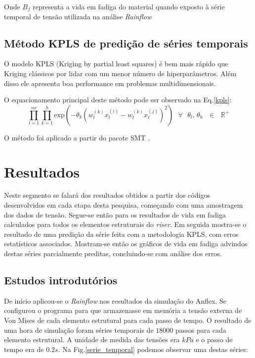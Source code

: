Onde $B_f$ representa a vida em fadiga do material quando exposto à série  temporal de tensão utilizada na análise \emph{Rainflow}

\subsection{Método KPLS de predição de séries temporais}

O modelo KPLS (Kriging by partial least squares) é bem mais rápido que Kriging clássicos por lidar com um menor número de hiperparâmetros. Além disso ele apresenta boa performance em problemas multidimensionais.

O equacionamento principal deste método pode ser observado na Eq.\ref{kpls}:
\begin{equation}\label{kpls}
    \prod^{nx}_{l=1} \prod^{h}_{k=1} \text{exp} \left( -\theta_k \left(w_l^{(k)} x_l^{(i)} - w_l^{(k)} x_l^{(j)} \right)^2\right) \text{      $\forall$ $\theta_l$, $\theta_h$ $\in$ $\mathds{R^+}$}
\end{equation}

O método foi aplicado a partir do pacote SMT \cite{BOUHLEL2019}.

\section{Resultados}

Neste segmento se falará dos resultados obtidos a partir dos códigos desenvolvidos em cada etapa desta pesquisa, começando com uma amostragem dos dados de tensão. Segue-se então para os resultados de vida em fadiga calculados para todos os elementos estruturais do \emph{riser}. Em seguida mostra-se o resultado de uma predição da série feita com a metodologia KPLS, com erros estatísticos associados. Mostram-se então os gráficos de vida em fadiga advindos destas séries parcialmente preditas, concluindo-se com análise dos erros.

\subsection{Estudos introdutórios}

De início aplicou-se o \emph{Rainflow} nos resultados da simulação do Anflex. Se configurou o programa para que armazenasse em memória a tensão externa de Von Mises de cada elemento estrutural para cada passo de tempo. O resultado de uma hora de simulação foram séries temporais de $18000$ passos para cada elemento estrutural. A unidade de medida das tensões era $kPa$ e o passo de tempo era de $0.2 s$. Na Fig.\ref{serie_temporal} podemos observar uma destas séries:

